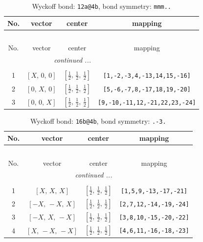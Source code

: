 \documentclass[fleqn,8pt]{jsarticle}
\begin{document}
\begin{longtable}{cccc}
\caption{Wyckoff bond: {\tt 12a@4b}, bond symmetry: {\tt mmm..}}
 \\
 \hline \hline
No. & vector & center & mapping \\ \hline \endfirsthead

\multicolumn{3}{l}{\tablename\ \thetable{}} \\
 \hline \hline
No. & vector & center & mapping \\ \hline \endhead

 \hline \hline
\multicolumn{3}{r}{\footnotesize\it continued ...} \\ \endfoot

 \hline \hline
\multicolumn{3}{r}{} \\ \endlastfoot

1 & $\left[ X,\, 0,\, 0 \right]$ & $\left[ \frac{1}{2},\, \frac{1}{2},\, \frac{1}{2} \right]$ & {\tt [1,-2,-3,4,-13,14,15,-16]} \\ \hline
2 & $\left[ 0,\, X,\, 0 \right]$ & $\left[ \frac{1}{2},\, \frac{1}{2},\, \frac{1}{2} \right]$ & {\tt [5,-6,-7,8,-17,18,19,-20]} \\ \hline
3 & $\left[ 0,\, 0,\, X \right]$ & $\left[ \frac{1}{2},\, \frac{1}{2},\, \frac{1}{2} \right]$ & {\tt [9,-10,-11,12,-21,22,23,-24]} \\
\end{longtable}
\renewcommand{\arraystretch}{1.2}
\begin{longtable}{cccc}
\caption{Wyckoff bond: {\tt 16b@4b}, bond symmetry: {\tt .-3.}}
 \\
 \hline \hline
No. & vector & center & mapping \\ \hline \endfirsthead

\multicolumn{3}{l}{\tablename\ \thetable{}} \\
 \hline \hline
No. & vector & center & mapping \\ \hline \endhead

 \hline \hline
\multicolumn{3}{r}{\footnotesize\it continued ...} \\ \endfoot

 \hline \hline
\multicolumn{3}{r}{} \\ \endlastfoot

1 & $\left[ X,\, X,\, X \right]$ & $\left[ \frac{1}{2},\, \frac{1}{2},\, \frac{1}{2} \right]$ & {\tt [1,5,9,-13,-17,-21]} \\ \hline
2 & $\left[ - X,\, - X,\, X \right]$ & $\left[ \frac{1}{2},\, \frac{1}{2},\, \frac{1}{2} \right]$ & {\tt [2,7,12,-14,-19,-24]} \\ \hline
3 & $\left[ - X,\, X,\, - X \right]$ & $\left[ \frac{1}{2},\, \frac{1}{2},\, \frac{1}{2} \right]$ & {\tt [3,8,10,-15,-20,-22]} \\ \hline
4 & $\left[ X,\, - X,\, - X \right]$ & $\left[ \frac{1}{2},\, \frac{1}{2},\, \frac{1}{2} \right]$ & {\tt [4,6,11,-16,-18,-23]} \\
\end{longtable}
\end{document}
